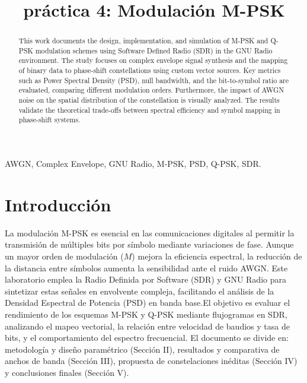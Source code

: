\documentclass[conference, 10pt]{IEEEtran}
\begin{document}
\title{práctica 4: Modulación M-PSK}

\author{
}

\maketitle

\begin{abstract}
This work documents the design, implementation, and simulation of M-PSK and Q-PSK modulation schemes using Software Defined Radio (SDR) in the GNU Radio environment. The study focuses on complex envelope signal synthesis and the mapping of binary data to phase-shift constellations using custom vector sources. Key metrics such as Power Spectral Density (PSD), null bandwidth, and the bit-to-symbol ratio are evaluated, comparing different modulation orders. Furthermore, the impact of AWGN noise on the spatial distribution of the constellation is visually analyzed. The results validate the theoretical trade-offs between spectral efficiency and symbol mapping in phase-shift systems.
\end{abstract}

\begin{IEEEkeywords}
AWGN, Complex Envelope, GNU Radio, M-PSK, PSD, Q-PSK, SDR.
\end{IEEEkeywords}

\section{Introducción}
La modulación M-PSK es esencial en las comunicaciones digitales al permitir la transmisión de múltiples bits por símbolo mediante variaciones de fase. Aunque un mayor orden de modulación ($M$) mejora la eficiencia espectral, la reducción de la distancia entre símbolos aumenta la sensibilidad ante el ruido AWGN. Este laboratorio emplea la Radio Definida por Software (SDR) y GNU Radio para sintetizar estas señales en envolvente compleja, facilitando el análisis de la Densidad Espectral de Potencia (PSD) en banda base.El objetivo es evaluar el rendimiento de los esquemas M-PSK y Q-PSK mediante flujogramas en SDR, analizando el mapeo vectorial, la relación entre velocidad de baudios y tasa de bits, y el comportamiento del espectro frecuencial. El documento se divide en: metodología y diseño paramétrico (Sección II), resultados y comparativa de anchos de banda (Sección III), propuesta de constelaciones inéditas (Sección IV) y conclusiones finales (Sección V).
\end{document}
